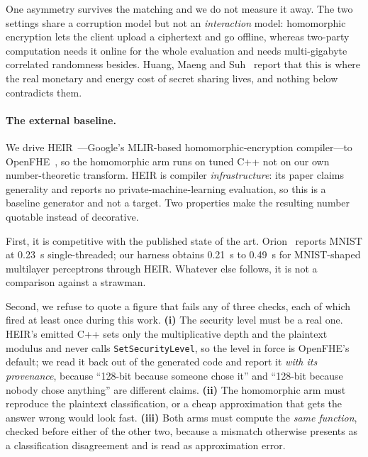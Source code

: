 \documentclass[11pt]{article}
\begin{document}
One asymmetry survives the matching and we do not measure it away. The two
settings share a corruption model but not an \emph{interaction} model: homomorphic
encryption lets the client upload a ciphertext and go offline, whereas two-party
computation needs it online for the whole evaluation and needs multi-gigabyte
correlated randomness besides. Huang, Maeng and Suh~\cite{BeyondLatency} report
that this is where the real monetary and energy cost of secret sharing lives, and
nothing below contradicts them.

\paragraph{The external baseline.} We drive
HEIR~\cite{HEIR}---Google's MLIR-based homomorphic-encryption compiler---to
OpenFHE~\cite{OpenFHE}, so the homomorphic arm runs on tuned C++ not on
our own number-theoretic transform. HEIR is compiler \emph{infrastructure}: its
paper claims generality and reports no private-machine-learning evaluation, so
this is a baseline generator and not a target. Two properties make the resulting
number quotable instead of decorative.

First, it is competitive with the published state of the art.
Orion~\cite{Orion} reports MNIST at \SI{0.23}{\second} single-threaded; our
harness obtains \SI{0.21}{\second} to \SI{0.49}{\second} for MNIST-shaped
multilayer perceptrons through HEIR. Whatever else follows, it is not a comparison
against a strawman.

Second, we refuse to quote a figure that fails any of three checks, each
of which fired at least once during this work. \textbf{(i)} The security level
must be a real one. HEIR's emitted C++ sets only the multiplicative depth and
the plaintext modulus and never calls \texttt{SetSecurityLevel}, so the level in
force is OpenFHE's default; we read it back out of the generated code and report
it \emph{with its provenance}, because ``128-bit because someone chose it'' and
``128-bit because nobody chose anything'' are different claims. \textbf{(ii)} The
homomorphic arm must reproduce the plaintext classification, or a cheap
approximation that gets the answer wrong would look fast. \textbf{(iii)} Both arms
must compute the \emph{same function}, checked before either of the other two,
because a mismatch otherwise presents as a classification disagreement and is
read as approximation error.
\end{document}
